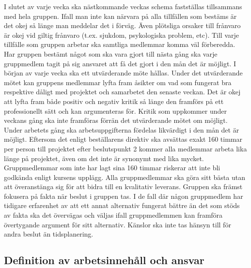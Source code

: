 \documentclass{article}
\begin{document}
I slutet av varje vecka ska nästkommande veckas schema fastställas tillsammans med hela gruppen. Ifall man inte kan närvara på alla tillfällen som bestäms är det okej så länge man meddelar det i förväg. Även plötsliga orsaker till frånvaro är okej vid giltig frånvaro (t.ex. sjukdom, psykologiska problem, etc).
\newline\newline
Till varje tillfälle som gruppen arbetar ska samtliga medlemmar komma väl förberedda. Har gruppen bestämt något som ska vara gjort till nästa gång ska varje gruppmedlem tagit på sig ansvaret att få det gjort i den mån det är möjligt.
\newline\newline
I början av varje vecka ska ett utvärderande möte hållas. Under det utvärderande mötet kan gruppens medlemmar lyfta fram åsikter om vad som fungerat bra respektive dåligt med projektet och samarbetet den senaste veckan. Det är okej att lyfta fram både positiv och negativ kritik så länge den framförs på ett professionellt sätt och kan argumenteras för. Kritik som uppkommer under veckans gång ska inte framföras förrän det utvärderande mötet om möjligt.
\newline\newline
Under arbetets gång ska arbetsuppgifterna fördelas likvärdigt i den mån det är möjligt. Eftersom det enligt beställarens direktiv ska avsättas exakt 160 timmar per person till projektet efter beslutspunkt 2 kommer alla medlemmar arbeta lika länge på projektet, även om det inte är synonymt med lika mycket. Gruppmedlemmar som inte har lagt sina 160 timmar riskerar att inte bli godkända enligt kursens upplägg.
\newline\newline
Alla gruppmedlemmar ska göra sitt bästa utan att överanstänga sig för att bidra till en kvalitativ leverans.
\newline\newline
Gruppen ska främst fokusera på fakta när beslut i gruppen tas. I de fall där någon gruppmedlem har tidigare erfarenhet av att ett annat alternativ fungerat bättre än det som stöds av fakta ska det övervägas och väljas ifall gruppmedlemmen kan framföra övertygande argument för sitt alternativ. Känslor ska inte tas hänsyn till för andra beslut än tidsplanering.

\subsection{Definition av arbetsinnehåll och ansvar}
\end{document}
